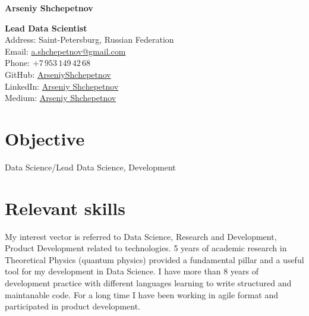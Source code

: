 \documentclass[10pt,a4paper]{article}
\newcommand{\vacancyName}{PhD student}
\begin{document}
	

	\raggedright{\Large{\textbf{Arseniy Shchepetnov}}}\\[0.3cm]
	
	\begin{minipage}[t]{0.7\textwidth}
		\vspace{0pt}
		\raggedright{\textbf{Lead Data Scientist}}\\[0.3cm]
		\noindent Address: Saint-Petersburg, Russian Federation \\[0.1cm]
		\noindent Email: \href{mailto:a.shchepetnov@gmail.com}{a.shchepetnov@gmail.com}\\[0.1cm]
		\noindent Phone: $+7\,953\,149\,42\,68$ \\
		\noindent GitHub: \href{https://github.com/ArseniyShchepetnov}{ArseniyShchepetnov}\\
            \noindent LinkedIn: \href{https://www.linkedin.com/in/arseniy-shchepetnov-4a236171/}{Arseniy Shchepetnov}\\
            \noindent Medium: \href{https://medium.com/@a.shchepetnov}{Arseniy Shchepetnov}
	\end{minipage}
	\begin{minipage}[t]{0.2\textwidth}
		\vspace{0pt}
	\end{minipage}
	
	
	\section*{Objective}
	
	Data Science/Lead Data Science, Development
	
	\section*{Relevant skills}
	
	\setlength{\parindent}{3em}

	
My interest vector is referred to Data Science, Research and Development, Product Development related to technologies.
5 years of academic research in Theoretical Physics (quantum physics) provided a fundamental pillar and a useful tool for my development in Data Science.
I have more than 8 years of development practice with different languages learning to write structured and maintanable code.
For a long time I have been working in agile format and participated in product development. 
\end{document}
